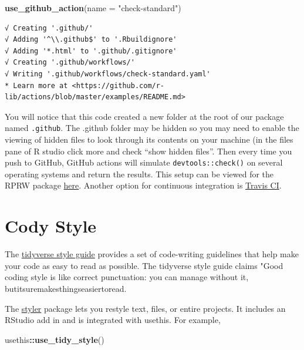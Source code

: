 \documentclass[
]{book}
\newenvironment{Shaded}{\begin{snugshade}}{\end{snugshade}}
\newcommand{\DataTypeTok}[1]{\textcolor[rgb]{0.13,0.29,0.53}{#1}}
\newcommand{\KeywordTok}[1]{\textcolor[rgb]{0.13,0.29,0.53}{\textbf{#1}}}
\newcommand{\NormalTok}[1]{#1}
\newcommand{\OperatorTok}[1]{\textcolor[rgb]{0.81,0.36,0.00}{\textbf{#1}}}
\newcommand{\StringTok}[1]{\textcolor[rgb]{0.31,0.60,0.02}{#1}}
\begin{document}
\begin{Shaded}
\begin{Highlighting}[]
\KeywordTok{use_github_action}\NormalTok{(}\DataTypeTok{name =} \StringTok{"check-standard"}\NormalTok{)}
\end{Highlighting}
\end{Shaded}

\begin{verbatim}
√ Creating '.github/'
√ Adding '^\\.github$' to '.Rbuildignore'
√ Adding '*.html' to '.github/.gitignore'
√ Creating '.github/workflows/'
√ Writing '.github/workflows/check-standard.yaml'
* Learn more at <https://github.com/r-lib/actions/blob/master/examples/README.md>
\end{verbatim}

You will notice that this code created a new folder at the root of our package named \texttt{.github}. The .github folder may be hidden so you may need to enable the viewing of hidden files to look through its contents on your machine (in the files pane of R studio click more and check ``show hidden files''. Then every time you push to GitHub, GitHub actions will simulate \texttt{devtools::check()} on several operating systems and return the results. This setup can be viewed for the RPRW package \href{https://github.com/michaeldumelle/RPRW/actions}{here}. Another option for continuous integration is \href{https://travis-ci.org/}{Travis CI}.

\hypertarget{style}{%
\section{Cody Style}\label{style}}

The \href{https://style.tidyverse.org/}{tidyverse style guide} provides a set of code-writing guidelines that help make your code as easy to read as possible. The tidyverse style guide claims "Good coding style is like correct punctuation: you can manage without it, butitsuremakesthingseasiertoread.

The \href{https://styler.r-lib.org/}{styler} package lets you restyle text, files, or entire projects. It includes an RStudio add in and is integrated with usethis. For example,

\begin{Shaded}
\begin{Highlighting}[]
\NormalTok{usethis}\OperatorTok{::}\KeywordTok{use_tidy_style}\NormalTok{()}
\end{Highlighting}
\end{Shaded}
\end{document}
